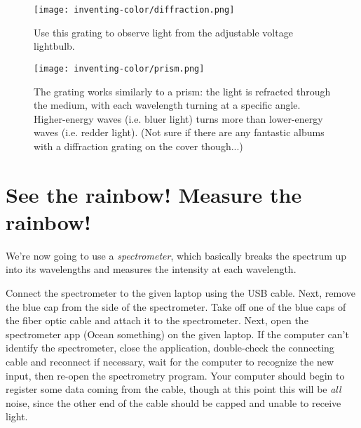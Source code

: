 \begin{figure}
\label{fig:grating}
       \centering
       \texttt{[image: inventing-color/diffraction.png]}
       \caption{Use this grating to observe light from the adjustable voltage lightbulb.}
\end{figure}

\begin{figure}
\label{fig:grating}
       \centering
       \texttt{[image: inventing-color/prism.png]}
       \caption{The grating works similarly to a prism: the light is refracted
through the medium, with each wavelength turning at a specific angle.
Higher-energy waves (i.e. bluer light) turns more than lower-energy waves (i.e.
redder light). (Not sure if there are any fantastic albums with a diffraction
grating on the cover though...)}
\end{figure}

\noindent
{}
\hspace{0.3cm}
\vspace{0.2cm}
\begin{minipage}{0.5\textwidth}
\end{minipage}

\section{See the rainbow! Measure the rainbow!}
\noindent
{}

We're now going to use a \emph{spectrometer}, which basically breaks the
spectrum up into its wavelengths and measures the intensity at each wavelength.

Connect the spectrometer to the given laptop using the USB cable.  Next, remove
the blue cap from the side of the spectrometer. Take off one of the blue caps
of the fiber optic cable and attach it to the spectrometer.  Next, open the
spectrometer app (Ocean something) on the given laptop.  If the computer can't
identify the spectrometer, close the application, double-check the connecting
cable and reconnect if necessary, wait for the computer to recognize the new
input, then re-open the spectrometry program. Your computer should begin to
register some data coming from the cable, though at this point this will be
\emph{all} noise, since the other end of the cable should be capped and unable
to receive light.

